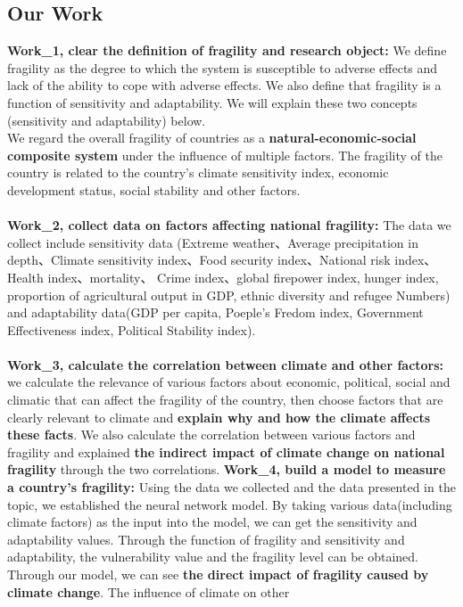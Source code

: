 \documentclass{mcmthesis}
\begin{document}
\subsection{Our Work}
  \textbf{Work\_1, clear the definition of fragility and research object:} We 
  define fragility as the degree to which the system is susceptible to adverse effects 
  and lack of the ability to cope with adverse effects. We also define that fragility 
  is a function of sensitivity and adaptability. We will explain these two concepts 
  (sensitivity and adaptability) below.\\ We regard the overall fragility of 
  countries as a \textbf{natural-economic-social composite system} under the influence of 
  multiple factors. The fragility of the country is related to the country's 
  climate sensitivity index, economic development status, social stability and 
  other factors.\\\\
  \textbf{Work\_2, collect data on factors affecting national fragility:} The data we
  collect include sensitivity data (Extreme weather、Average precipitation in depth、Climate
  sensitivity index、Food security index、National risk index、Health index、mortality、
  Crime index、global firepower index, hunger index,  proportion of agricultural output 
  in GDP, ethnic diversity and refugee Numbers) and adaptability data(GDP per capita, 
  Poeple's Fredom index, Government Effectiveness index, Political Stability index).\\\\
  \textbf{Work\_3, calculate the correlation between climate and other factors:}  
  we calculate the relevance of various factors about economic, political, social and climatic 
  that can affect the fragility of the country, then choose factors that are clearly relevant 
  to climate and \textbf{explain why and how the climate affects these facts}. We also calculate the 
  correlation between various factors and fragility and explained \textbf{the indirect impact of 
  climate change on national fragility} through the two correlations.
  \textbf{Work\_4, build a model to measure a country's fragility:} Using the data 
  we collected and the data presented in the topic, we established the neural network 
  model. By taking various data(including climate factors) as the input into the model, 
  we can get the sensitivity and adaptability values. Through the function of 
  fragility and sensitivity and adaptability, the vulnerability value and the 
  fragility level can be obtained. Through our model, we can see \textbf{the direct 
  impact of fragility caused by climate change}. The influence of climate on other 
\end{document}

